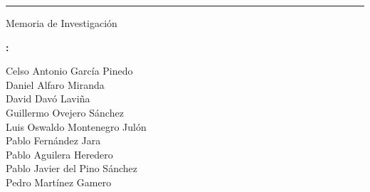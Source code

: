 \documentclass[12pt]{scrreprt}
\title{\productname}
\author{Grupo 4}
\date{\today}
\newcommand{\authorfull}{
    Celso Antonio García Pinedo \\
    Daniel Alfaro Miranda \\
    David Davó Laviña \\
    Guillermo Ovejero Sánchez \\
    Luis Oswaldo Montenegro Julón \\
    Pablo Fernández Jara \\
    Pablo Aguilera Heredero \\
    Pablo Javier del Pino Sánchez \\
    Pedro Martínez Gamero
}
\begin{document}
\begin{titlepage}
\makeatletter
{
\centering
\vspace*{4cm}
{\fontsize{40pt}{40pt}\bfseries\scshape\@title\par}
{\rule{0.5\textwidth}{1pt}\par}


{\Huge Memoria de Investigación\par}

\vspace*{1cm}
{\Large\textbf{\@author :}  \par}
{\large\itshape 
\authorfull
\par}
}
\vfill
\makeatother
\end{titlepage}

\tableofcontents
\newpage







\end{document}
